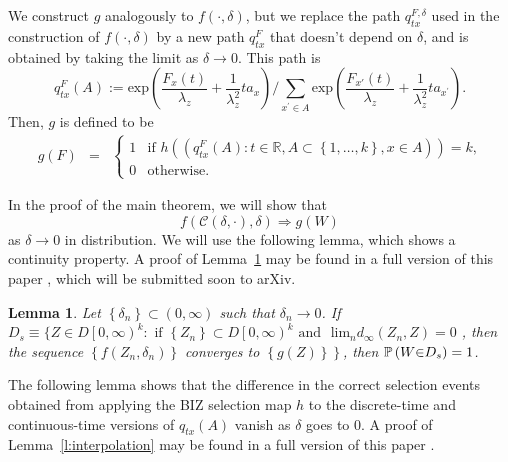 \documentclass{wscpaperproc}
\theoremstyle{wsc}
\newtheorem{lemma}{Lemma}
\begin{document}
We construct $g$ analogously to $f(\cdot,\delta)$, but we replace the path $q_{tx}^{F,\delta}$ used in the construction of $f(\cdot,\delta)$ by a new path $q_{tx}^{F}$ that doesn't depend on $\delta$, and is obtained by taking the limit as $\delta\to0$.  This path is
\[
q_{tx}^{F}\left(A\right):=\mbox{exp}\left(\frac{F_{x}\left(t\right)}{\lambda_{z}}+\frac{1}{\lambda_{z}^{2}}ta_{x}\right)/\sum_{x^{'}\in A}\mbox{exp}\left(\frac{F_{x'}\left(t\right)}{\lambda_{z}}+\frac{1}{\lambda_{z}^{2}}ta_{x^{'}}\right).
\]
Then, $g$ is defined to be
\begin{eqnarray*}
g\left(F\right) & = & \begin{cases}
    1 & \text{if $h\left(\left(q_{tx}^{F}\left(A\right):t\in\mathbb{R},A\subset\left\{ 1,\ldots,k\right\} ,x\in A\right)\right) = k$,}\\
0 & \text{otherwise.}
\end{cases}
\end{eqnarray*}


In the proof of the main theorem, we will show that 
\[
f\left(\mathcal{C}\left(\delta,\cdot\right),\delta\right)\Rightarrow g\left(W\right)
\]
as $\delta\rightarrow0$ in distribution. We will use the following lemma, which shows a continuity property.
A proof of Lemma~\ref{l:continuity} may be found in a full version of this paper \cite{fullpaper},
which will be submitted soon to arXiv. 

\begin{lemma}
Let $\left\{ \delta_{n}\right\} \subset\left(0,\infty\right)$ such
that $\delta_{n}\rightarrow0$. If $D_{s}\equiv\{Z\in D\left[0,\infty\right)^{k}:\mbox{ if }\left\{ Z_{n}\right\} \subset D\left[0,\infty\right)^{k}\mbox{ and }$
$\mbox{lim}{}_{n}d_{\infty}\left(Z_{n},Z\right)=0$ , then the sequence
$\left\{ f\left(Z_{n},\delta_{n}\right)\right\} $ converges to $\left\{ g\left(Z\right)\right\} $$\left.\right\} $$ $,
then $ $$\mathbb{P}\left(W\text{\ensuremath{\in}}D_{s}\right)=1$.
\label{l:continuity}
\end{lemma}


The following lemma shows that the difference in the correct selection events obtained from applying the BIZ selection map $h$ to the discrete-time and continuous-time versions of $q_{tx}(A)$ vanish as $\delta$ goes to $0$.
A proof of Lemma~\ref{l:interpolation} may be found in a full version of this paper \cite{fullpaper}.
\end{document}
